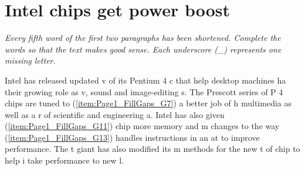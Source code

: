 \chapter{Intel chips get power boost}
\textit{Every fifth word of the first two paragraphs has been shortened. Complete the words so that the text makes good sense. Each underscore (\_) represents one missing letter.}

Intel has released updated v of its Pentium 4 c that help desktop machines ha their growing role as v, sound and image-editing s. The Prescott series of P 4 chips are tuned to (\ref{item:Page1_FillGaps_G7}) a better job of h multimedia as well as a r of scientific and engineering a. Intel has also given (\ref{item:Page1_FillGaps_G11}) chip more memory and m changes to the way (\ref{item:Page1_FillGaps_G13}) handles instructions in an at to improve performance. The t giant has also modified its m methods for the new t of chip to help i take performance to new l.

